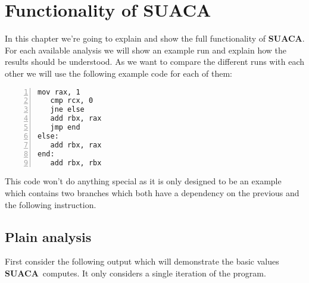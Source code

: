 \documentclass[a4paper,12pt,titlepage, twoside]{report}
\newcommand{\suaca}{\textbf{SUACA}}
\begin{document}

\chapter{Functionality of SUACA}
\label{chap:functionality}
In this chapter we're going to explain and show the full functionality of \suaca. For each available analysis we will show an example run and explain how the results should be understood. As we want to compare the different runs with each other we will use the following example code for each of them:

\begin{mdframed}[backgroundcolor=light-gray, roundcorner=10pt,leftmargin=1, rightmargin=1, innerleftmargin=15, innertopmargin=1,innerbottommargin=1, outerlinewidth=1, linecolor=light-gray]
\begin{lstlisting}[language={myLang}, basicstyle=\small, numbers=left]
   mov rax, 1
   cmp rcx, 0
   jne else
   add rbx, rax
   jmp end
else:
   add rbx, rax
end:
   add rbx, rbx
\end{lstlisting}
\end{mdframed}

This code won't do anything special as it is only designed to be an example which contains two branches which both have a dependency on the previous and the following instruction.

\section{Plain analysis}
\label{sec:plain}

First consider the following output which will demonstrate the basic values \suaca\ computes. It only considers a single iteration of the program.
\end{document}
